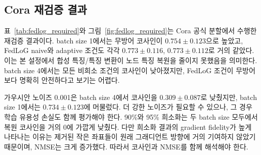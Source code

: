 \documentclass[10pt,twocolumn]{article}
\begin{document}
\begin{table}[t]
\caption{Cora 공식 분할 기반 FedLoG 식 재검증 결과($n=10$, 중복 제거)}
\label{tab:fedlog_required}
\centering
\footnotesize
{}
\end{table}

\subsection{Cora 재검증 결과}
표~\ref{tab:fedlog_required}와 그림~\ref{fig:fedlog_required}는 Cora 공식 분할에서 수행한 재검증 결과이다. batch size 1에서는 무방어 코사인이 $0.754 \pm 0.123$으로 높았고, FedLoG naive와 adaptive 조건도 각각 $0.773 \pm 0.116$, $0.773 \pm 0.112$로 거의 같았다. 이는 본 설정에서 합성 특징/특징 변환이 노드 특징 복원을 줄이지 못했음을 의미한다. batch size 4에서는 모든 비희소 조건의 코사인이 낮아졌지만, FedLoG 조건이 무방어보다 명확히 안전하다고 보기는 어렵다.

가우시안 노이즈 0.001은 batch size 4에서 코사인을 $0.309 \pm 0.087$로 낮췄지만, batch size 1에서는 $0.734 \pm 0.123$에 머물렀다. 더 강한 노이즈가 필요할 수 있으나, 그 경우 학습 유용성 손실도 함께 평가해야 한다. 90\%와 95\% 희소화는 두 batch size 모두에서 복원 코사인을 거의 0에 가깝게 낮췄다. 다만 희소화 결과의 gradient fidelity가 높게 나타나는 이유는 제거된 작은 좌표들이 원래 그래디언트 방향에 거의 기여하지 않았기 때문이며, NMSE는 크게 증가했다. 따라서 코사인과 NMSE를 함께 해석해야 한다.
\end{document}
